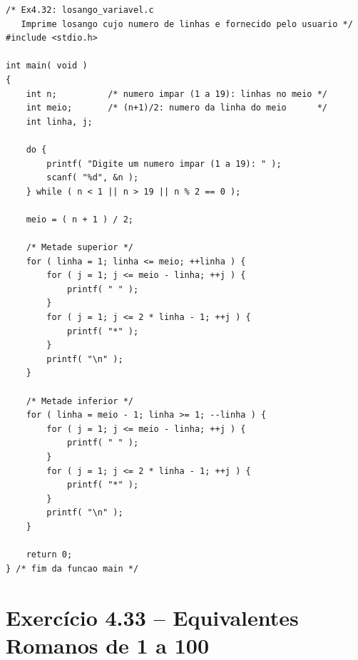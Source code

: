 \documentclass[12pt,a4paper]{article}
\begin{document}
\begin{respostabox}
\begin{lstlisting}
/* Ex4.32: losango_variavel.c
   Imprime losango cujo numero de linhas e fornecido pelo usuario */
#include <stdio.h>

int main( void )
{
    int n;          /* numero impar (1 a 19): linhas no meio */
    int meio;       /* (n+1)/2: numero da linha do meio      */
    int linha, j;

    do {
        printf( "Digite um numero impar (1 a 19): " );
        scanf( "%d", &n );
    } while ( n < 1 || n > 19 || n % 2 == 0 );

    meio = ( n + 1 ) / 2;

    /* Metade superior */
    for ( linha = 1; linha <= meio; ++linha ) {
        for ( j = 1; j <= meio - linha; ++j ) {
            printf( " " );
        }
        for ( j = 1; j <= 2 * linha - 1; ++j ) {
            printf( "*" );
        }
        printf( "\n" );
    }

    /* Metade inferior */
    for ( linha = meio - 1; linha >= 1; --linha ) {
        for ( j = 1; j <= meio - linha; ++j ) {
            printf( " " );
        }
        for ( j = 1; j <= 2 * linha - 1; ++j ) {
            printf( "*" );
        }
        printf( "\n" );
    }

    return 0;
} /* fim da funcao main */
\end{lstlisting}
\end{respostabox}

\section{Exercício 4.33 -- Equivalentes Romanos de 1 a 100}
\end{document}
